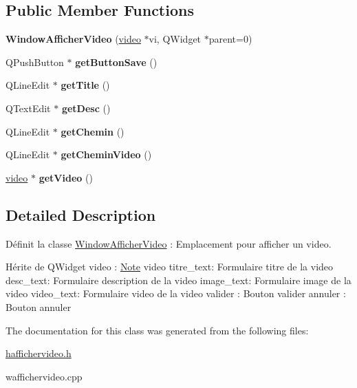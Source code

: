 \subsection*{Public Member Functions}
\begin{DoxyCompactItemize}
\item 
\mbox{\label{class_window_afficher_video_aedcddf13d2b603cb62243fc03d9baed7}} 
{\bfseries Window\+Afficher\+Video} (\hyperlink{classvideo}{video} $\ast$vi, Q\+Widget $\ast$parent=0)
\item 
\mbox{\label{class_window_afficher_video_a0f6a04c1f77238072715c18d154abc55}} 
Q\+Push\+Button $\ast$ {\bfseries get\+Button\+Save} ()
\item 
\mbox{\label{class_window_afficher_video_a6a249cb70e3cb731e904ac32c402a132}} 
Q\+Line\+Edit $\ast$ {\bfseries get\+Title} ()
\item 
\mbox{\label{class_window_afficher_video_a6e331106156efe2aa20f2e2a3ef50288}} 
Q\+Text\+Edit $\ast$ {\bfseries get\+Desc} ()
\item 
\mbox{\label{class_window_afficher_video_a04f10264a64ea1f9b53ffc251f3db367}} 
Q\+Line\+Edit $\ast$ {\bfseries get\+Chemin} ()
\item 
\mbox{\label{class_window_afficher_video_ab97619282397705914ab85e61320e69d}} 
Q\+Line\+Edit $\ast$ {\bfseries get\+Chemin\+Video} ()
\item 
\mbox{\label{class_window_afficher_video_a047e278dbc118e01521c1238a6130358}} 
\hyperlink{classvideo}{video} $\ast$ {\bfseries get\+Video} ()
\end{DoxyCompactItemize}


\subsection{Detailed Description}
Définit la classe \hyperlink{class_window_afficher_video}{Window\+Afficher\+Video} \+: Emplacement pour afficher un video. 

Hérite de Q\+Widget video \+: \hyperlink{class_note}{Note} video titre\+\_\+text\+: Formulaire titre de la video desc\+\_\+text\+: Formulaire description de la video image\+\_\+text\+: Formulaire image de la video video\+\_\+text\+: Formulaire video de la video valider \+: Bouton valider annuler \+: Bouton annuler 

The documentation for this class was generated from the following files\+:\begin{DoxyCompactItemize}
\item 
\hyperlink{haffichervideo_8h}{haffichervideo.\+h}\item 
waffichervideo.\+cpp\end{DoxyCompactItemize}
